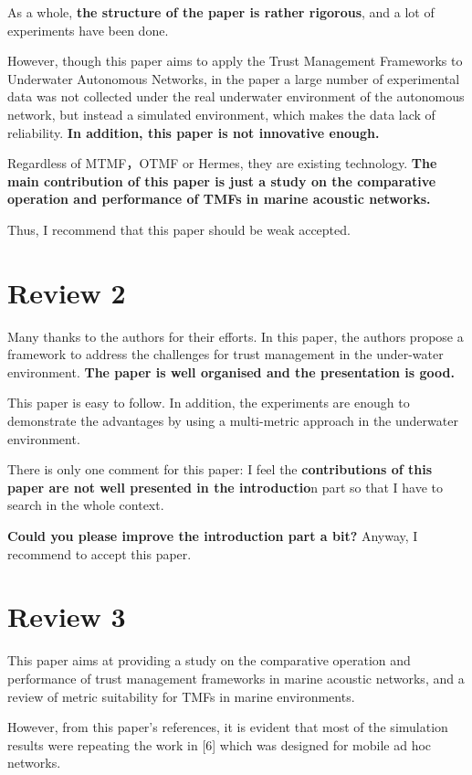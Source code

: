 \documentclass[]{article}
\begin{document}
As a whole, \textbf{the structure of the paper is rather rigorous}, and a lot of experiments have been done.

However, though this paper aims to apply the Trust Management Frameworks to Underwater Autonomous Networks, in the paper a large number of experimental data was not collected under the real underwater environment of the autonomous network, but instead a simulated environment, which makes the data lack of reliability. \textbf{In addition, this paper is not innovative enough. }

Regardless of MTMF，OTMF or Hermes, they are existing technology. \textbf{The main contribution of this paper is just a study on the comparative operation and performance of TMFs in marine acoustic networks.}

Thus, I recommend that this paper should be weak accepted.

\section{Review 2}

Many thanks to the authors for their efforts. In this paper, the authors propose a framework to address the challenges for trust management in the under-water environment. \textbf{The paper is well organised and the presentation is good. }

This paper is easy to follow. In addition, the experiments are enough to demonstrate the advantages by using a multi-metric approach in the underwater environment. 

There is only one comment for this paper: I feel the \textbf{contributions of this paper are not well presented in the introductio}n part so that I have to search in the whole context. 

\textbf{Could you please improve the introduction part a bit?} Anyway, I recommend to accept this paper.

\section{Review 3}

This paper aims at providing a study on the comparative operation and performance of trust management frameworks in marine acoustic networks, and a review of metric suitability for TMFs in marine environments. 

However, from this paper's references, it is evident that most of the simulation results were repeating the work in [6] which was designed for mobile ad hoc networks.
\end{document}

